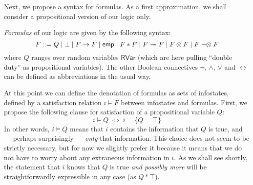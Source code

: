 \documentclass[envcountsame,envcountsect]{llncs}
\renewcommand{\iff}{\Leftrightarrow}
\newcommand{\emp}{\mathsf{emp}}
\newcommand{\wand}{%
  \mathrel{\mbox{$\hspace*{-0.03em}\mathord{-}\hspace*{-0.66em}
  \mathord{-}\hspace*{-0.36em}\mathord{*}$\hspace*{-0.005em}}}}
\newcommand{\lolly}{%
  \mathrel{\mbox{$\hspace*{-0.03em}\mathord{-}\hspace*{-0.66em}
  \mathord{-}\hspace*{-0.16em}\mathord{\otimes}$\hspace*{-0.005em}}}}
\newcommand{\rvar}{\mathsf{RVar}}
\newcommand{\false}{\bot}
\newcommand{\true}{\top}
\theoremstyle{plain}
\begin{document}
Next, we propose a syntax for formulas.  As a first approximation, we shall consider a propositional version of our logic only.

\begin{definition}[Formula]
\label{defn:formula}
\emph{Formulas} of our logic are given by the following syntax:
\[
F ::= Q \mid \false \mid F \rightarrow F \mid \emp \mid F * F \mid F \wand F \mid F \otimes F \mid F \lolly F
\]
where $Q$ ranges over random variables $\rvar$ (which are here pulling ``double duty'' as propositional variables). The other Boolean connectives $\neg$, $\wedge$, $\vee$ and $\leftrightarrow$ can be defined as abbreviations in the usual way.
\end{definition}

At this point we can define the denotation of formulas as sets of infostates, defined by a satisfaction relation $i \models F$ between infostates and formulas. First, we propose the following clause for satisfaction of a
propositional variable $Q$:
\begin{equation}
i \models Q \;\iff\; i = \{Q=\true\} %
\end{equation}
In other words, $i \models Q$ means that $i$ contains the information that $Q$ is true, and --- perhaps surprisingly --- \emph{only} that information.  This choice does not seem to be strictly necessary, but for now we slightly prefer it because it means that we do not have to worry about any extraneous information in $i$.  As we shall see shortly, the statement that $i$ knows that $Q$ is true \emph{and possibly more} will be straightforwardly expressible in any case (as $Q * \true$).
\end{document}
